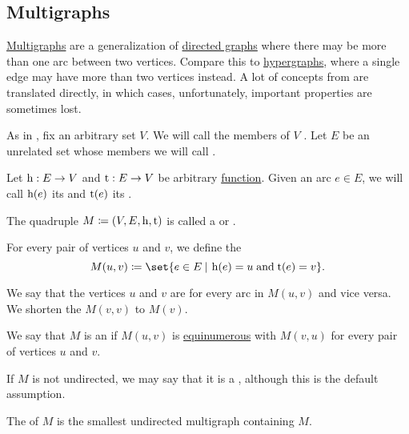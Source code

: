 \subsection{Multigraphs}\label{subsec:multigraphs}

\hyperref[def:multigraph]{Multigraphs} are a generalization of \hyperref[def:graph/directed]{directed graphs} where there may be more than one arc between two vertices. Compare this to \hyperref[def:hypergraph]{hypergraphs}, where a single edge may have more than two vertices instead. A lot of concepts from  are translated directly, in which cases, unfortunately, important properties are sometimes lost.

\begin{definition}\label{def:multigraph}
  As in , fix an arbitrary set \( V \). We will call the members of \( V \) . Let \( E \) be an unrelated set whose members we will call .

  Let \( \operatorname{h}: E \to V \) and \( \operatorname{t}: E \to V \) be arbitrary \hyperref[def:function]{function}. Given an arc \( e \in E \), we will call \( \operatorname{h}(e) \) its  and \( \operatorname{t}(e) \) its .

  The quadruple \( M \coloneqq (V, E, \operatorname{h}, \operatorname{t}) \) is called a  or .

  \begin{thmenum}
     For every pair of vertices \( u \) and \( v \), we define the 
    \begin{equation}\label{eq:def:multigraph/arc_set}
      M(u, v) \coloneqq \set{ e \in E \given \head(e) = u \T{and} \tail(e) = v }.
    \end{equation}

    We say that the vertices \( u \) and \( v \) are  for every arc in \( M(u, v) \) and vice versa. We shorten the  \( M(v, v) \) to \( M(v) \).

     We say that \( M \) is an  if \( M(u, v) \) is \hyperref[def:equinumerosity]{equinumerous} with \( M(v, u) \) for every pair of vertices \( u \) and \( v \).

     If \( M \) is not undirected, we may say that it is a , although this is the default assumption.

     The  of \( M \) is the smallest undirected multigraph containing \( M \).


\end{thmenum}
\end{definition}
